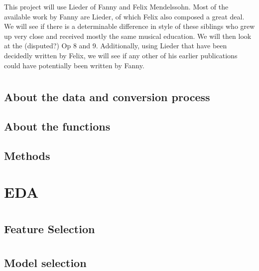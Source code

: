 \documentclass[12pt,twoside]{reedthesis}
\theoremstyle{definition}
\theoremstyle{definition}
\theoremstyle{definition}
\theoremstyle{remark}
\begin{document}
This project will use Lieder of Fanny and Felix Mendelssohn. Most of the
available work by Fanny are Lieder, of which Felix also composed a great
deal. We will see if there is a determinable difference in style of
these siblings who grew up very close and received mostly the same
musical education. We will then look at the (disputed?) Op 8 and 9.
Additionally, using Lieder that have been decidedly written by Felix, we
will see if any other of his earlier publications could have potentially
been written by Fanny.

\chapter{}\label{section-1}

\section{About the data and conversion
process}\label{about-the-data-and-conversion-process}

\section{About the functions}\label{about-the-functions}

\section{Methods}\label{methods}

\chapter{EDA}\label{eda}

\chapter{}\label{section-2}

\section{Feature Selection}\label{feature-selection}

\chapter{}\label{section-3}

\section{Model selection}\label{model-selection}
\end{document}
